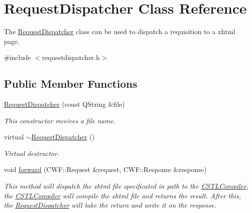\hypertarget{class_request_dispatcher}{}\section{Request\+Dispatcher Class Reference}
\label{class_request_dispatcher}


The \hyperlink{class_request_dispatcher}{Request\+Dispatcher} class can be used to dispatch a requisition to a xhtml page.  




{\ttfamily \#include $<$requestdispatcher.\+h$>$}

\subsection*{Public Member Functions}
\begin{DoxyCompactItemize}
\item 
\mbox{\label{class_request_dispatcher_a3251b6940f8b27a889b52617853338a0}} 
\hyperlink{class_request_dispatcher_a3251b6940f8b27a889b52617853338a0}{Request\+Dispatcher} (const Q\+String \&file)
\begin{DoxyCompactList}\small\item\em This constructor receives a file name. \end{DoxyCompactList}\item 
\mbox{\label{class_request_dispatcher_a19ee59b1fe3c38be480c181cc3408c45}} 
virtual \hyperlink{class_request_dispatcher_a19ee59b1fe3c38be480c181cc3408c45}{$\sim$\+Request\+Dispatcher} ()
\begin{DoxyCompactList}\small\item\em Virtual destructor. \end{DoxyCompactList}\item 
void \hyperlink{class_request_dispatcher_a6416fc9441670d1de84b3c8262d13220}{forward} (C\+W\+F\+::\+Request \&request, C\+W\+F\+::\+Response \&response)
\begin{DoxyCompactList}\small\item\em This method will dispatch the xhtml file specificated in path to the \hyperlink{class_c_s_t_l_compiler}{C\+S\+T\+L\+Compiler}, the \hyperlink{class_c_s_t_l_compiler}{C\+S\+T\+L\+Compiler} will compile the xhtml file and returns the result. After this, the \hyperlink{class_request_dispatcher}{Request\+Dispatcher} will take the return and write it on the response. \end{DoxyCompactList}\end{DoxyCompactItemize}


